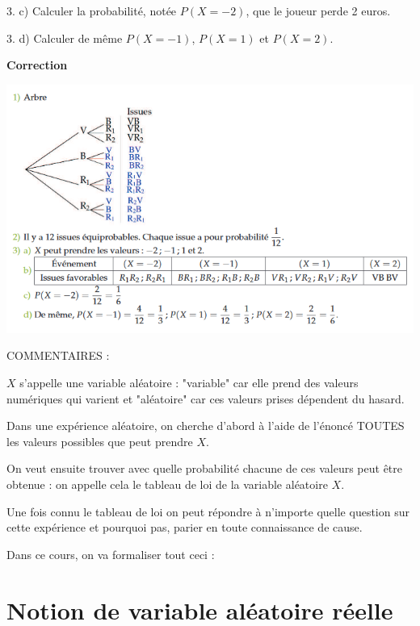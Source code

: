 \documentclass[11pt]{cornouaille}
\begin{document}
3. c)   Calculer la probabilit\'{e}, not\'{e}e $P\left( {X
= - 2} \right)$, que le joueur perde 2 euros.



3. d)  Calculer de m\^{e}me $P\left( {X = - 1} \right)$, $P\left(
{X = 1} \right)$ et $P\left( {X = 2} \right)$.






\textbf{Correction}



\includegraphics[scale=0.8]{corr1.png}


\bigskip

{\color{red}

COMMENTAIRES  :


$X$ s'appelle une variable aléatoire : "variable" car elle prend des valeurs numériques qui varient et "aléatoire" car ces valeurs prises dépendent du hasard.

Dans une expérience aléatoire, on cherche d'abord à l'aide de l'énoncé TOUTES les valeurs possibles que peut prendre $X$.

On veut ensuite trouver avec quelle probabilité chacune de ces valeurs peut être obtenue : on appelle cela le tableau de loi de la variable aléatoire $X$.

Une fois connu le tableau de loi on peut répondre à n'importe quelle question sur cette expérience et pourquoi pas, parier en toute connaissance de cause.

Dans ce cours, on va formaliser tout ceci :

}
\section{Notion de variable aléatoire réelle}
\end{document}
